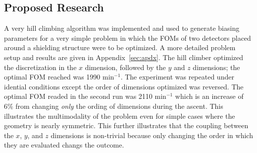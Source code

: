 \documentclass{article}
\begin{document}










\subsection{Proposed Research}\label{sec:b3}
A very hill climbing algorithm was implemented and used to generate biasing parameters for a very simple problem in which the FOMs of two detectors placed around a shielding structure were to be optimized. A more detailed problem setup and results are given in Appendix~\ref{sec:apdx}. The hill climber optimized the discretization in the $x$ dimension, followed by the $y$ and $z$ dimensions; the optimal FOM reached was 1990 min$^{-1}$. The experiment was repeated under idential conditions except the order of dimensions optimized was reversed. The optimal FOM readed in the second run was 2110 min$^{-1}$ which is an increase of 6\% from changing \textit{only} the ording of dimensions during the ascent. This illustrates the multimodality of the problem even for simple cases where the geometry is nearly symmetric. This further illustrates that the coupling between the $x$, $y$, and $z$ dimensions is non-trivial because only changing the order in which they are evaluated changs the outcome.
\end{document}
